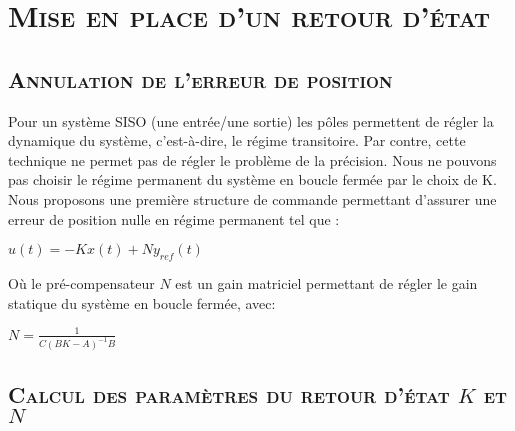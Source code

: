 \chapter{\textsc{Mise en place d'un retour d'état}}

	\section{\textsc{Annulation de l'erreur de position}}
	
	\par Pour un système SISO (une entrée/une sortie) les pôles permettent de régler la dynamique du système, c’est-à-dire, le régime transitoire. Par contre, cette technique ne permet pas de régler le problème de la précision. Nous ne pouvons pas choisir le régime permanent du système en boucle fermée par le choix de K. Nous proposons une première structure de commande permettant d’assurer une erreur de position nulle en régime permanent tel que \cite{ref1} :
	
	\begin{center}
	$u(t) = -Kx(t) + Ny_{ref}(t)$ 
	\end{center}		

	Où le pré-compensateur $N$ est un gain matriciel permettant de régler le gain statique du système en boucle fermée, avec:
	
	\begin{center}
	$N = \frac{1}{C(BK-A)^{-1}B}$ 
	\end{center}	

	\section{ \textsc{Calcul des paramètres du retour d'état $K$ et $N$}}
	
